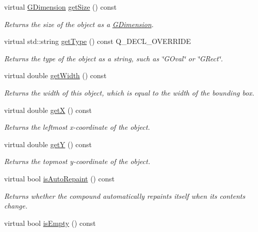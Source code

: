 \begin{DoxyCompactItemize}
virtual \mbox{\hyperlink{classGDimension}{G\+Dimension}} \mbox{\hyperlink{classGObject_a7b4eec96a2bdc6420695d5796a78eea9}{get\+Size}} () const
\begin{DoxyCompactList}\small\item\em Returns the size of the object as a {\ttfamily \mbox{\hyperlink{classGDimension}{G\+Dimension}}}. \end{DoxyCompactList}\item 
virtual std\+::string \mbox{\hyperlink{classGCompound_a9896d58fcfebbf1025aeeb5b8b9ede80}{get\+Type}} () const Q\+\_\+\+D\+E\+C\+L\+\_\+\+O\+V\+E\+R\+R\+I\+DE
\begin{DoxyCompactList}\small\item\em Returns the type of the object as a string, such as {\ttfamily \char`\"{}\+G\+Oval\char`\"{}} or {\ttfamily \char`\"{}\+G\+Rect\char`\"{}}. \end{DoxyCompactList}\item 
virtual double \mbox{\hyperlink{classGObject_a0ed2965abd4f5701d2cadf71239faf19}{get\+Width}} () const
\begin{DoxyCompactList}\small\item\em Returns the width of this object, which is equal to the width of the bounding box. \end{DoxyCompactList}\item 
virtual double \mbox{\hyperlink{classGObject_a344385751bee0720059403940d57a13e}{getX}} () const
\begin{DoxyCompactList}\small\item\em Returns the leftmost {\itshape x}-\/coordinate of the object. \end{DoxyCompactList}\item 
virtual double \mbox{\hyperlink{classGObject_aafa51c7f8f38a09febbb9ce7853f77b4}{getY}} () const
\begin{DoxyCompactList}\small\item\em Returns the topmost {\itshape y}-\/coordinate of the object. \end{DoxyCompactList}\item 
virtual bool \mbox{\hyperlink{classGCompound_a12c8d52ddfcaa5448ec4bace92ddee6c}{is\+Auto\+Repaint}} () const
\begin{DoxyCompactList}\small\item\em Returns whether the compound automatically repaints itself when its contents change. \end{DoxyCompactList}\item 
virtual bool \mbox{\hyperlink{classGCompound_acf82f9b2937375c7b1cf3dccb3df3312}{is\+Empty}} () const

\end{DoxyCompactItemize}
